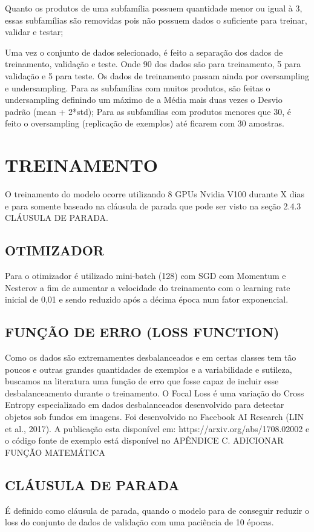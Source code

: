Quanto os produtos de uma subfamília possuem quantidade menor ou igual à 3, essas subfamílias são removidas pois não possuem dados o suficiente para treinar, validar e testar;

Uma vez o conjunto de dados selecionado, é feito a separação dos dados de treinamento, validação e teste. Onde 90 dos dados são para treinamento, 5 para validação e 5 para teste. Os dados de treinamento passam ainda por oversampling e undersampling.
Para as subfamílias com muitos produtos, são feitas o undersampling definindo um máximo de a Média mais duas vezes o Desvio padrão (mean + 2*std);
Para as subfamílias com produtos menores que 30, é feito o oversampling (replicação de exemplos) até ficarem com 30 amostras.

\section{TREINAMENTO}

O treinamento do modelo ocorre utilizando 8 GPUs Nvidia V100 durante X dias e para somente baseado na cláusula de parada que pode ser visto na seção 2.4.3 CLÁUSULA DE PARADA. 

\subsection{OTIMIZADOR}

Para o otimizador é utilizado mini-batch (128) com SGD com Momentum e Nesterov a fim de aumentar a velocidade do treinamento com o learning rate inicial de 0,01 e sendo reduzido após a décima época num fator exponencial.

\subsection{FUNÇÃO DE ERRO (LOSS FUNCTION)}

Como os dados são extremamentes desbalanceados e em certas classes tem tão poucos e outras grandes quantidades de exemplos e a variabilidade e sutileza, buscamos na literatura uma função de erro que fosse capaz de incluir esse desbalanceamento durante o treinamento.
O Focal Loss é uma variação do Cross Entropy especializado em dados desbalanceados desenvolvido para detectar objetos sob fundos em imagens. Foi desenvolvido no Facebook AI Research (LIN et al., 2017). A publicação esta disponível em: https://arxiv.org/abs/1708.02002 e o código fonte de exemplo está disponível no APÊNDICE C.
ADICIONAR FUNÇÃO MATEMÁTICA

\subsection{CLÁUSULA DE PARADA}

É definido como cláusula de parada, quando o modelo para de conseguir reduzir o loss do conjunto de dados de validação com uma paciência de 10 épocas.
